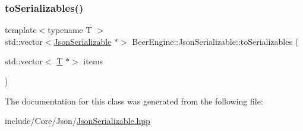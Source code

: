 \mbox{\label{class_beer_engine_1_1_json_serializable_a80649111ff7da289151d17201f9e1d19}} 
\subsubsection{\texorpdfstring{to\+Serializables()}{toSerializables()}}
{\footnotesize\ttfamily template$<$typename T $>$ \\
std\+::vector$<$\mbox{\hyperlink{class_beer_engine_1_1_json_serializable}{Json\+Serializable}} $\ast$$>$ Beer\+Engine\+::\+Json\+Serializable\+::to\+Serializables (\begin{DoxyParamCaption}\item[{std\+::vector$<$ \mbox{\hyperlink{namespace_beer_engine_a94f0b552f6dc910de8cdb44207981f53a8de48e594408f9fc561b2f68ce05f664}{T}} $\ast$$>$}]{items }\end{DoxyParamCaption})\hspace{0.3cm}{\ttfamily [inline]}}



The documentation for this class was generated from the following file\+:\begin{DoxyCompactItemize}
\item 
include/\+Core/\+Json/\mbox{\hyperlink{_json_serializable_8hpp}{Json\+Serializable.\+hpp}}\end{DoxyCompactItemize}
